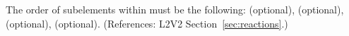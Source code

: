 The order of subelements within \Reaction must be the following:
 (optional),  (optional),
 (optional),  (optional).
(References: L2V2 Section~\ref{sec:reactions}.)
